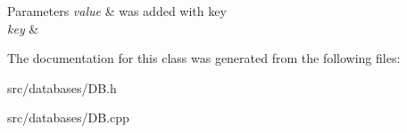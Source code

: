 \begin{DoxyParams}{Parameters}
{\em value} & was added with key \\
\hline
{\em key} & \\
\hline
\end{DoxyParams}


The documentation for this class was generated from the following files\+:\begin{DoxyCompactItemize}
\item 
src/databases/D\+B.\+h\item 
src/databases/D\+B.\+cpp\end{DoxyCompactItemize}
